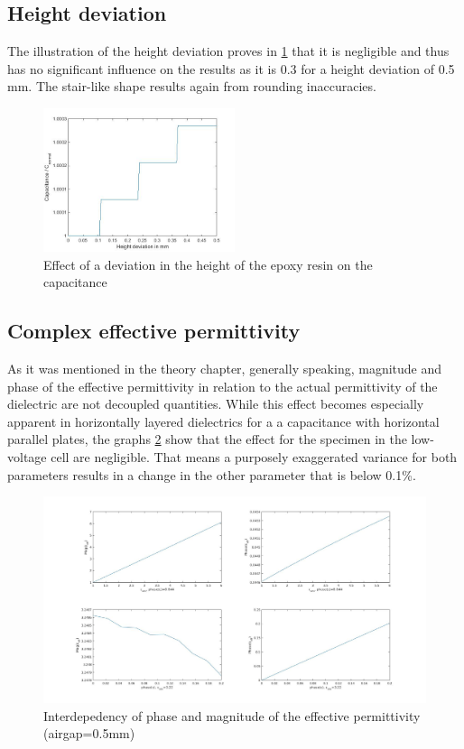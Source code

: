 \subsection{Height deviation}
The illustration of the height deviation proves in \ref{fig.heightdev} that it is negligible and thus has no significant influence on the results as it is 0.3 \text{\textperthousand} for  a height deviation of 0.5 mm. The stair-like shape results again from rounding inaccuracies.  
 \begin{figure}[h!tb]
	\centering
	\includegraphics[width=0.5\textwidth]{figures/Results/airgap_height/Height_deviation.jpg}		
	\caption[Kurze Abbildungsbeschreibung]{Effect of a deviation in the height of the epoxy resin on the capacitance}
	\label{fig.heightdev}
\end{figure}

\subsection{Complex effective permittivity}
As it was mentioned in the theory chapter, generally speaking, magnitude and phase of the effective permittivity in relation to the
actual permittivity of the dielectric are not decoupled quantities. While this effect becomes especially apparent in horizontally layered dielectrics for a
a capacitance with horizontal parallel plates, the graphs \ref{fig.complex} show that the effect for the specimen in the low-voltage cell are negligible. That means a purposely exaggerated variance for both parameters
results in a change in the other parameter that is below 0.1\%.

\begin{figure}[htbp]
	\centering
	\centerline{\includegraphics[width=\textwidth]{figures/Results/Complex/complex_permittivity_specimen}}		
	\caption[Kurze Abbildungsbeschreibung]{Interdepedency of phase and magnitude of the effective permittivity (airgap=0.5mm) } 
	\label{fig.complex}
\end{figure}


